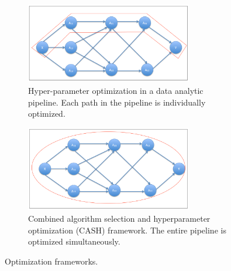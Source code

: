 \begin{figure}[ht!]
\begin{adjustbox}{right}
   \begin{subfigure}{\columnwidth}
   \centering
      \includegraphics[width=0.8\textwidth]{img/EP/HPO}
      \caption{Hyper-parameter optimization in a data analytic pipeline. Each path in the pipeline is individually optimized.}
      \label{fig:HPO}
   \end{subfigure}
\end{adjustbox}

\begin{adjustbox}{right}
   \begin{subfigure}{\columnwidth}
   \centering
      \includegraphics[width=0.8\textwidth]{img/EP/CASH}
      \caption{Combined algorithm selection and hyperparameter optimization (CASH) framework. The entire pipeline is optimized simultaneously.}
      \label{fig:CASH}
   \end{subfigure}
\end{adjustbox}
\caption{Optimization frameworks.}\label{fig:frameworks}
\end{figure}




